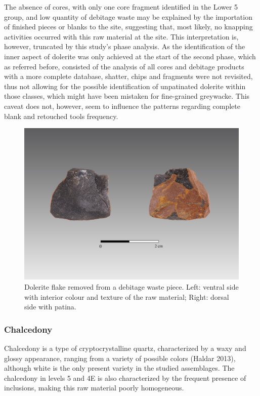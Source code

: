 \documentclass[12pt,twoside]{reedthesis}
\begin{document}
The absence of cores, with only one core fragment identified in the Lower 5 group, and low quantity of debitage waste may be explained by the importation of finished pieces or blanks to the site, suggesting that, most likely, no knapping activities occurred with this raw material at the site. This interpretation is, however, truncated by this study's phase analysis. As the identification of the inner aspect of dolerite was only achieved at the start of the second phase, which as referred before, consisted of the analysis of all cores and debitage products with a more complete database, shatter, chips and fragments were not revisited, thus not allowing for the possible identification of unpatinated dolerite within those classes, which might have been mistaken for fine-grained greywacke. This caveat does not, however, seem to influence the patterns regarding complete blank and retouched tools frequency.
\begin{figure}[H]

{\centering \includegraphics[width=0.7\linewidth]{figure/doleritephoto} 

}

\caption[Dolerite flake removed from a debitage waste piece.]{Dolerite flake removed from a debitage waste piece. Left: ventral side with interior colour and texture of the raw material; Right: dorsal side with patina.}\label{fig:doleritephoto}
\end{figure}
\hypertarget{chalcedony}{%
\subsubsection{Chalcedony}\label{chalcedony}}

Chalcedony is a type of cryptocrystalline quartz, characterized by a waxy and glossy appearance, ranging from a variety of possible colors (Haldar 2013), although white is the only present variety in the studied assemblages. The chalcedony in levels 5 and 4E is also characterized by the frequent presence of inclusions, making this raw material poorly homogeneous.
\end{document}
